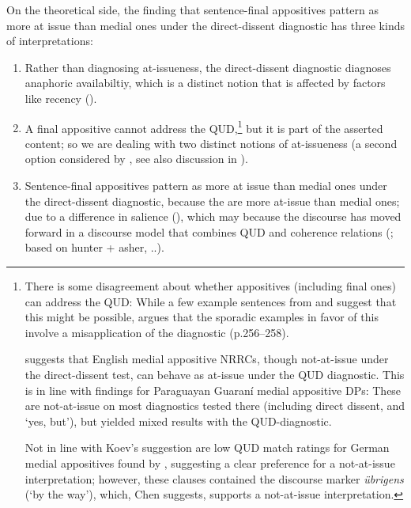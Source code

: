 \documentclass[times,linguex,xcolor]{glossa}
\begin{document}
  On the theoretical side, the finding that sentence-final appositives pattern as more at issue than medial ones under the direct-dissent diagnostic has three kinds of interpretations:
  \begin{enumerate}
    \item Rather than diagnosing at-issueness, the direct-dissent diagnostic diagnoses anaphoric availabiltiy, which is a distinct notion that is affected by factors like recency (\citealt{snider_anaphoric_2017,snider_at-issuenessne_2017,snider_distinguishing_2018}).

    \item  A final appositive cannot address the QUD,\footnote{
      There is some disagreement about whether appositives (including final ones) can address the QUD: While a few example sentences from \citet{anderbois_at-issue_2015} and \citet{syrett_experimental_2015} suggest that this might be possible, \citealt{snider_anaphoric_2017} argues that the sporadic examples in favor of this involve a misapplication of the diagnostic (p.256--258).

      \citealt{koev_notions_2018} suggests that English medial appositive NRRCs, though not-at-issue under the direct-dissent test, can behave as at-issue under the QUD diagnostic. This is in line with  findings for Paraguayan Guaraní medial appositive DPs: These are not-at-issue on most diagnostics tested there (including direct dissent, and `yes, but'), but yielded mixed results with the QUD-diagnostic.

      Not in line with Koev's suggestion are low QUD match ratings for German medial appositives found by \citet{chen_presuppositions_2024}, suggesting a clear preference for a not-at-issue interpretation; however, these clauses contained the discourse marker \emph{übrigens} (‘by the way’), which, Chen suggests, supports a not-at-issue interpretation.


    } but it is part of the asserted content; so we are dealing with two distinct notions of at-issueness (a second option considered by \citet{snider_anaphoric_2017}, see also discussion in \citealt{koev_notions_2018}).

    \item Sentence-final appositives pattern as more at issue than medial ones under the direct-dissent diagnostic, because the are more at-issue than medial ones; due to a difference in salience (\citealt{syrett_experimental_2015}), which may because the discourse has moved forward in a discourse model that combines QUD and coherence relations (\citealt{jasinskaja_not_2016}; based on hunter + asher, ..).

  \end{enumerate}
    
\end{document}
